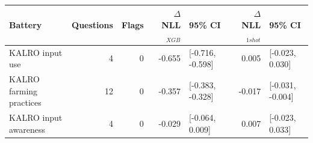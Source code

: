 \begin{tabular}{lrrrlrl}\toprule
Battery & Questions & Flags & $\Delta$ NLL$_{XGB}$ & 95\% CI & $\Delta$ NLL$_{1shot}$ & 95\% CI \\
\midrule
KALRO input use & 4 & 0 & -0.655 & [-0.716, -0.598] & 0.005 & [-0.023, 0.030] \\
KALRO farming practices & 12 & 0 & -0.357 & [-0.383, -0.328] & -0.017 & [-0.031, -0.004] \\
KALRO input awareness & 4 & 0 & -0.029 & [-0.064, 0.009] & 0.007 & [-0.023, 0.033] \\
\bottomrule\end{tabular}
